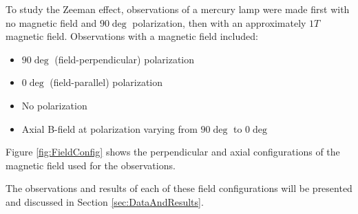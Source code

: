 \documentclass[twocolumn]{article}
\begin{document}
	To study the Zeeman effect, observations of a mercury lamp were made first with no magnetic field and $90\deg$ polarization, then with an approximately $1T$ magnetic field.
	Observations with a magnetic field included:
	\begin{itemize}
		\item $90\deg$ (field-perpendicular) polarization
		\item $0\deg$ (field-parallel) polarization 
		\item No polarization
		\item Axial B-field at polarization varying from $90\deg$ to $0\deg$
	\end{itemize}
	
	Figure \ref{fig:FieldConfig} shows the perpendicular and axial configurations of the magnetic field used for the observations.
	
	The observations and results of each of these field configurations will be presented and discussed in Section \ref{sec:DataAndResults}.
	
	 
	
\end{document}
